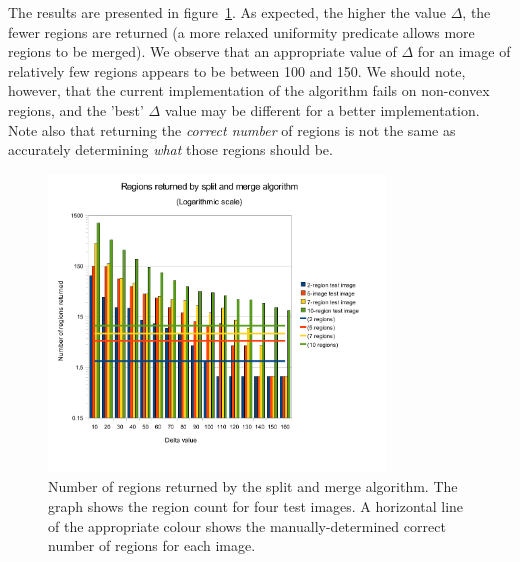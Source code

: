 The results are presented in figure~\ref{fig:region-counts}. As expected, the higher the value $\Delta$, the fewer regions are returned (a more relaxed uniformity predicate allows more regions to be merged). We observe that an appropriate value of $\Delta$ for an image of relatively few regions appears to be between 100 and 150. We should note, however, that the current implementation of the algorithm fails on non-convex regions, and the 'best' $\Delta$ value may be different for a better implementation. Note also that returning the \emph{correct number} of regions is not the same as accurately determining \emph{what} those regions should be.

\begin{figure}[h]
  \centering
  \includegraphics[width=0.8\textwidth]{figures/region-counts}
  \caption[Regions returned by split and merge algorithm]{Number of regions returned by the split and merge algorithm. The graph shows the region count for four test images. A horizontal line of the appropriate colour shows the manually-determined correct number of regions for each image.}
  \label{fig:region-counts}
\end{figure}
